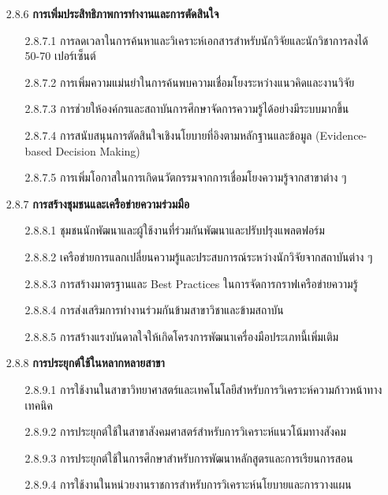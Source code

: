 \documentclass[12pt,a4paper]{article}
\begin{document}
\begin{enumerate}[leftmargin=2cm]
{        \begin{enumerate}
            \item[2.8.6] \textbf{การเพิ่มประสิทธิภาพการทำงานและการตัดสินใจ}
            \begin{enumerate}
                \item[2.8.7.1] การลดเวลาในการค้นหาและวิเคราะห์เอกสารสำหรับนักวิจัยและนักวิชาการลงได้ 50-70 เปอร์เซ็นต์
                \item[2.8.7.2] การเพิ่มความแม่นยำในการค้นพบความเชื่อมโยงระหว่างแนวคิดและงานวิจัย
                \item[2.8.7.3] การช่วยให้องค์กรและสถาบันการศึกษาจัดการความรู้ได้อย่างมีระบบมากขึ้น
                \item[2.8.7.4] การสนับสนุนการตัดสินใจเชิงนโยบายที่อิงตามหลักฐานและข้อมูล (Evidence-based Decision Making)
                \item[2.8.7.5] การเพิ่มโอกาสในการเกิดนวัตกรรมจากการเชื่อมโยงความรู้จากสาขาต่าง ๆ
            \end{enumerate}

            \item[2.8.7] \textbf{การสร้างชุมชนและเครือข่ายความร่วมมือ}
            \begin{enumerate}
                \item[2.8.8.1] ชุมชนนักพัฒนาและผู้ใช้งานที่ร่วมกันพัฒนาและปรับปรุงแพลตฟอร์ม
                \item[2.8.8.2] เครือข่ายการแลกเปลี่ยนความรู้และประสบการณ์ระหว่างนักวิจัยจากสถาบันต่าง ๆ
                \item[2.8.8.3] การสร้างมาตรฐานและ Best Practices ในการจัดการกราฟเครือข่ายความรู้
                \item[2.8.8.4] การส่งเสริมการทำงานร่วมกันข้ามสาขาวิชาและข้ามสถาบัน
                \item[2.8.8.5] การสร้างแรงบันดาลใจให้เกิดโครงการพัฒนาเครื่องมือประเภทนี้เพิ่มเติม
            \end{enumerate}

            \item[2.8.8] \textbf{การประยุกต์ใช้ในหลากหลายสาขา}
            \begin{enumerate}
                \item[2.8.9.1] การใช้งานในสาขาวิทยาศาสตร์และเทคโนโลยีสำหรับการวิเคราะห์ความก้าวหน้าทางเทคนิค
                \item[2.8.9.2] การประยุกต์ใช้ในสาขาสังคมศาสตร์สำหรับการวิเคราะห์แนวโน้มทางสังคม
                \item[2.8.9.3] การประยุกต์ใช้ในการศึกษาสำหรับการพัฒนาหลักสูตรและการเรียนการสอน
                \item[2.8.9.4] การใช้งานในหน่วยงานราชการสำหรับการวิเคราะห์นโยบายและการวางแผน
            \end{enumerate}
        \end{enumerate}

}
\end{enumerate}
\end{document}
